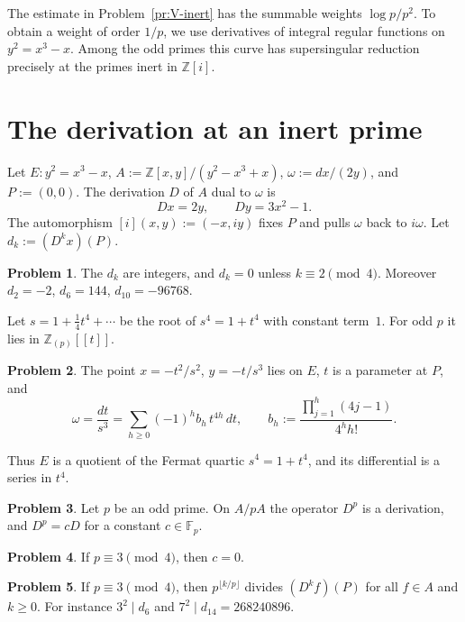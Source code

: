 \documentclass[reqno]{amsart}
\theoremstyle{definition}
\newtheorem{problem}{Problem}[section]
\theoremstyle{plain}
\newcommand{\F}{\mathbb{F}}
\newcommand{\Z}{\mathbb{Z}}
\newcommand{\Zi}{\Z[i]}
\begin{document}
The estimate in Problem~\ref{pr:V-inert} has the summable weights \(\log p/p^2\).  To obtain a weight of order \(1/p\), we use derivatives of integral regular functions on \(y^2 = x^3 - x\).  Among the odd primes this curve has supersingular reduction precisely at the primes inert in \(\Zi\).

\section{The derivation at an inert prime}\label{sec:derivation}

Let \(E \colon y^2 = x^3 - x\), \(A := \Z[x, y]/(y^2 - x^3 + x)\), \(\omega := dx/(2y)\), and \(P := (0, 0)\).  The derivation \(D\) of \(A\) dual to \(\omega\) is
\[
  Dx = 2y, \qquad Dy = 3x^2 - 1.
\]
The automorphism \([i](x, y) := (-x, iy)\) fixes \(P\) and pulls \(\omega\) back to \(i\omega\).  Let \(d_k := (D^k x)(P)\).

\begin{problem}\label{pr:dk}
The \(d_k\) are integers, and \(d_k = 0\) unless \(k \equiv 2 \pmod 4\).  Moreover \(d_2 = -2\), \(d_6 = 144\), \(d_{10} = -96768\).
\end{problem}

Let \(s = 1 + \frac14 t^4 + \dotsb\) be the root of \(s^4 = 1 + t^4\) with constant term~\(1\).  For odd \(p\) it lies in \(\Z_{(p)}[[t]]\).

\begin{problem}\label{pr:fermat}
The point \(x = -t^2/s^2\), \(y = -t/s^3\) lies on \(E\), \(t\) is a parameter at \(P\), and
\[
  \omega = \frac{dt}{s^3} = \sum_{h \ge 0} (-1)^h b_h \, t^{4h} \, dt,
  \qquad
  b_h := \frac{\prod_{j=1}^h (4j - 1)}{4^h h!}.
\]
\end{problem}

Thus \(E\) is a quotient of the Fermat quartic \(s^4 = 1 + t^4\), and its differential is a series in \(t^4\).

\begin{problem}\label{pr:Dp-cD}
Let \(p\) be an odd prime.  On \(A/pA\) the operator \(D^p\) is a derivation, and \(D^p = cD\) for a constant \(c \in \F_p\).
\end{problem}

\begin{problem}\label{pr:c-zero}
If \(p \equiv 3 \pmod 4\), then \(c = 0\).
\end{problem}

\begin{problem}\label{pr:dk-div}
If \(p \equiv 3 \pmod 4\), then \(p^{\lfloor k/p \rfloor}\) divides \((D^k f)(P)\) for all \(f \in A\) and \(k \ge 0\).  For instance \(3^2 \mid d_6\) and \(7^2 \mid d_{14} = 268240896\).
\end{problem}
\end{document}
